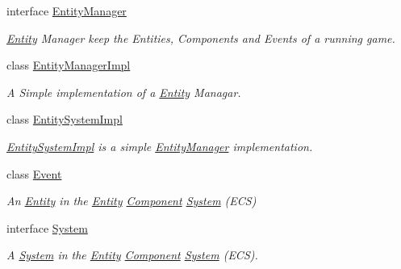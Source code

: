 \begin{DoxyCompactItemize}
interface \hyperlink{interfacebr_1_1unb_1_1unbomber_1_1core_1_1_entity_manager}{Entity\+Manager}
\begin{DoxyCompactList}\small\item\em \hyperlink{classbr_1_1unb_1_1unbomber_1_1core_1_1_entity}{Entity} Manager keep the Entities, Components and Events of a running game. \end{DoxyCompactList}\item 
class \hyperlink{classbr_1_1unb_1_1unbomber_1_1core_1_1_entity_manager_impl}{Entity\+Manager\+Impl}
\begin{DoxyCompactList}\small\item\em A Simple implementation of a \hyperlink{classbr_1_1unb_1_1unbomber_1_1core_1_1_entity}{Entity} Managar. \end{DoxyCompactList}\item 
class \hyperlink{classbr_1_1unb_1_1unbomber_1_1core_1_1_entity_system_impl}{Entity\+System\+Impl}
\begin{DoxyCompactList}\small\item\em \hyperlink{classbr_1_1unb_1_1unbomber_1_1core_1_1_entity_system_impl}{Entity\+System\+Impl} is a simple \hyperlink{interfacebr_1_1unb_1_1unbomber_1_1core_1_1_entity_manager}{Entity\+Manager} implementation. \end{DoxyCompactList}\item 
class \hyperlink{classbr_1_1unb_1_1unbomber_1_1core_1_1_event}{Event}
\begin{DoxyCompactList}\small\item\em An \hyperlink{classbr_1_1unb_1_1unbomber_1_1core_1_1_entity}{Entity} in the \hyperlink{classbr_1_1unb_1_1unbomber_1_1core_1_1_entity}{Entity} \hyperlink{classbr_1_1unb_1_1unbomber_1_1core_1_1_component}{Component} \hyperlink{interfacebr_1_1unb_1_1unbomber_1_1core_1_1_system}{System} (E\+C\+S) \end{DoxyCompactList}\item 
interface \hyperlink{interfacebr_1_1unb_1_1unbomber_1_1core_1_1_system}{System}
\begin{DoxyCompactList}\small\item\em A \hyperlink{interfacebr_1_1unb_1_1unbomber_1_1core_1_1_system}{System} in the \hyperlink{classbr_1_1unb_1_1unbomber_1_1core_1_1_entity}{Entity} \hyperlink{classbr_1_1unb_1_1unbomber_1_1core_1_1_component}{Component} \hyperlink{interfacebr_1_1unb_1_1unbomber_1_1core_1_1_system}{System} (E\+C\+S). \end{DoxyCompactList}\end{DoxyCompactItemize}
